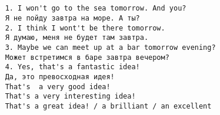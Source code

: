\subsection*{}
\begin{verbatim}
    1. I won't go to the sea tomorrow. And you?
    Я не пойду завтра на море. А ты?
    2. I think I wont't be there tomorrow.
    Я думаю, меня не будет там завтра.
    3. Maybe we can meet up at a bar tomorrow evening?
    Может встретимся в баре завтра вечером?
    4. Yes, that's a fantastic idea!
    Да, это превосходная идея!
    That's  a very good idea!
    That's a very interesting idea!
    That's a great idea! / a brilliant / an excellent
\end{verbatim}